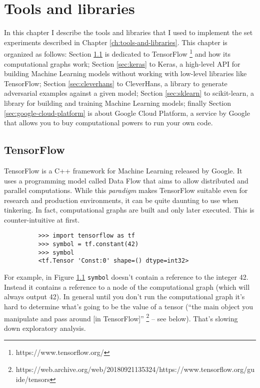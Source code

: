 \chapter{Tools and libraries}

In this chapter I describe the tools and libraries that I used to implement
the set experiments described in Chapter \ref{ch:tools-and-libraries}. This
chapter is organized as follows: Section \ref{sec:tensorflow} is dedicated to
TensorFlow \footnote{https://www.tensorflow.org/} and how its computational graphs work;
Section \ref{sec:keras} to Keras, a high-level API for building
Machine Learning models without working with low-level libraries like
TensorFlow; Section \ref{sec:cleverhans} to CleverHans, a
library to generate adversarial examples against a given model;
Section \ref{sec:sklearn} to scikit-learn, a library for building
and training Machine Learning models;
finally Section \ref{sec:google-cloud-platform} is about Google Cloud
Platform, a service by Google that allows you to buy computational
powers to run your own code.

\section{TensorFlow}
\label{sec:tensorflow}

TensorFlow is a C++ framework for Machine Learning released by Google.
It uses a programming model called Data Flow that aims to allow
distributed and parallel computations. While this \emph{paradigm} makes
TensorFlow suitable even for research and production environments, it
can be quite daunting to use when tinkering. In fact, computational
graphs are built and only later executed. This is counter-intuitive at
first.

\begin{figure}
  \begin{verbatim}
    >>> import tensorflow as tf
    >>> symbol = tf.constant(42)
    >>> symbol
    <tf.Tensor 'Const:0' shape=() dtype=int32>
  \end{verbatim}
  \caption{}
  \label{fig:fortytwo}
\end{figure}

For example, in Figure \ref{fig:fortytwo}
\texttt{symbol} doesn't contain a reference to the integer 42. Instead
it contains a reference to a node of the computational graph (which
will always output 42). In general until you don't run the
computational graph it's hard to determine what's going to be the value
of a tensor (``the main object you manipulate and pass around [in TensorFlow]''%
\footnote{https://web.archive.org/web/20180921135324/https://www.tensorflow.org/guide/tensors}
-- see below). That's slowing down exploratory analysis.

